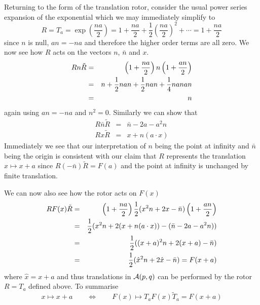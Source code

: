 Returning to the form of the translation rotor, consider the usual power series 
expansion of the exponential which we may immediately simplify to
%
\begin{equation}
R=T_a = \exp\left({\frac{na}{2}}\right) = 1 + \frac{na}{2} +
\frac{1}{2}\left(\frac{na}{2}\right)^2 + \cdots   = 1 +
\frac{na}{2}
\end{equation}
%
since $n$ is null, $an = -na$ and therefore the higher order terms are all
zero. We now see how $R$ acts on the vectors $n$, $\bar{n}$ and $x$.
%
\begin{eqnarray}
 Rn\tilde{R} & = & \left(1 + \frac{na}{2}\right)n\left(1 + \frac{an}{2}\right) \nonumber \\
                & = &  n + \frac{1}{2}nan + \frac{1}{2}nan + \frac{1}{4}nanan \nonumber \\
                & = & n
                \label{rntrans}
\end{eqnarray}
%
again using  $an= - na$ and $n^2=0$.    Similarly we can
show that
%
\begin{eqnarray}
 R\bar{n}\tilde{R} & = &  \bar{n}  - 2a - a^2n \\
 Rx\tilde{R}          & = &  x + n(a\cdot x)
\end{eqnarray}
%
Immediately we see that our interpretation of $n$ being the point at
infinity and $\bar{n}$ being the origin is consistent with our claim that
$R$ represents the translation $x \mapsto x+a$ since 
$R(-\bar{n})\tilde{R} = F(a)$
and the point at infinity is unchanged by finite translation.

We can now also see how the rotor acts on $F(x)$
%
\begin{eqnarray}
RF(x)\tilde{R} & = & \left(1 + \frac{na}{2}\right)\frac{1}{2}(x^2n + 2x - \bar{n})\left(1 + \frac{an}{2}\right) \nonumber \\
                & = &  \frac{1}{2}(x^2n + 2(x + n(a\cdot x)) - (\bar{n} - 2a - a^2n))   \nonumber \\
                & = &  \frac{1}{2}((x+a)^2n + 2(x+a) - \bar{n}) \nonumber \\
                & = &  \frac{1}{2}(\hat{x}^2 n + 2\hat{x} - \bar{n}) = F(x+a)
\end{eqnarray}
%
where $\hat{x}=x+a$ and thus translations in
${\mathcal{A}}(p,q)$ can be performed by the
rotor  $R=T_a$ defined above. To summarise
 \begin{equation}
x \mapsto x+a \qquad \Leftrightarrow \qquad F(x) \mapsto T_a
F(x) \tilde{T}_a = F(x+a)
\end{equation}

